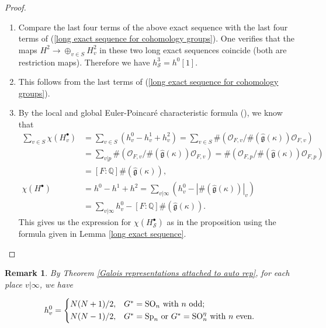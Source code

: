 \documentclass[12pt,oneside,reqno]{amsart}
\theoremstyle{plain}
\newtheorem{remark}[theorem]{Remark}
\begin{document}
\begin{proof}
\begin{enumerate}
			\item 
			Compare the last four terms of the above exact
			sequence with the
			last four terms of
			(\ref{long exact sequence for cohomology groups}).
			One verifies that
			the maps
			$H^2
			\rightarrow
			\oplus_{v\in S}
			H^2_v$
			in these two long exact sequences
			coincide
			(both are restriction maps).
			Therefore we have
			$h^3_{\mathcal{S}}
			=
			h^0[1]$.
			
			
			
			\item 
			This follows from
			the last terms of
			(\ref{long exact sequence for cohomology groups}).
			
			\item
			By the local and global Euler-Poincar\'{e}
			characteristic formula
			(\cite[Chapter I, Theorems 2.8 \& 5.1]{Milne2006}),
			we know that
			\begin{align*}
				\sum_{v\in S}\chi(H_v^\bullet)
				&
				=
				\sum_{v\in S}
				(h_v^0-h_v^1+h_v^2)
				=
				\sum_{v\in S}
				\# 
				(
				\mathcal{O}_{F,v}/
				\# (\widehat{\mathfrak{g}}(\kappa))
				\mathcal{O}_{F,v}
				)
				\\
				&
				=
				\sum_{v |p}
				\# 
				(
				\mathcal{O}_{F,v}/
				\# (\widehat{\mathfrak{g}}(\kappa))
				\mathcal{O}_{F,v}
				)
				=
				\# 
				(
				\mathcal{O}_{F,p}/
				\# (\widehat{\mathfrak{g}}(\kappa))
				\mathcal{O}_{F,p}
				)
				\\
				&
				=
				[F:\mathbb{Q}]
				\# 
				(
				\widehat{\mathfrak{g}}(\kappa)
				),
				\\
				\chi(H^\bullet)
				&
				=
				h^0-h^1+h^2
				=
				\sum_{v |\infty}
				(
				h_v^0-
				|\# 
				(
				\widehat{\mathfrak{g}}(\kappa)
				)|_v
				)
				\\
				&
				=
				\sum_{v |\infty}h_v^0
				-
				[F:\mathbb{Q}]
				\# 
				(
				\widehat{\mathfrak{g}}(\kappa)
				).
			\end{align*}
			This gives us the expression for
			$\chi(H_{\mathcal{S}}^\bullet)$
			as in the proposition
			using the formula given in
			Lemma
			\ref{long exact sequence}.
			
		\end{enumerate}
		
	\end{proof}
	
	\begin{remark}\label{dimension for infinite H_v^0}\rm 
		By Theorem \ref{Galois representations attached to auto rep}, for each place $v|\infty$, we have
		
		\[
		h_v^0
		=
		\begin{cases*}
			N(N+1)/2,
			&
			$G^\ast=\mathrm{SO}_n$ with $n$ odd;
			\\
			N(N-1)/2,
			&
			$G^\ast=\mathrm{Sp}_n$ or $G^\ast=\mathrm{SO}_n^\eta$ with $n$ even.
		\end{cases*}
		\]
	\end{remark}
	
\end{document}
